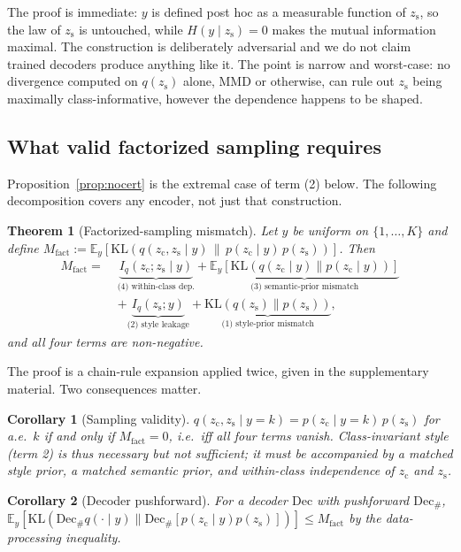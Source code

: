 \documentclass[letterpaper]{article}
\newtheorem{theorem}{Theorem}
\newtheorem{corollary}{Corollary}
\newcommand{\zc}{z_{\mathrm{c}}}
\newcommand{\zs}{z_{\mathrm{s}}}
\newcommand{\KL}{\mathrm{KL}}
\begin{document}
The proof is immediate: $y$ is defined post hoc as a measurable function of
$\zs$, so the law of $\zs$ is untouched, while $H(y\mid\zs)=0$ makes the
mutual information maximal. The construction is deliberately adversarial and
we do not claim trained decoders produce anything like it. The point is
narrow and worst-case: no divergence computed on $q(\zs)$ alone, MMD or
otherwise, can rule out $\zs$ being maximally class-informative, however the
dependence happens to be shaped.

\subsection{What valid factorized sampling requires}

Proposition~\ref{prop:nocert} is the extremal case of term (2) below. The
following decomposition covers any encoder, not just that construction.

\begin{theorem}[Factorized-sampling mismatch]
\label{thm:decomp}
Let $y$ be uniform on $\{1,\dots,K\}$ and define
$M_{\mathrm{fact}} := \mathbb E_y[\KL(q(\zc,\zs\mid y)\,\|\,p(\zc\mid
y)\,p(\zs))]$. Then
\begin{align*}
M_{\mathrm{fact}} =\;& \underbrace{I_q(\zc;\zs\mid y)}_{\text{(4) within-class dep.}}
 + \underbrace{\mathbb E_y[\KL(q(\zc\mid y)\|p(\zc\mid y))]}_{\text{(3) semantic-prior mismatch}}\\
 &+ \underbrace{I_q(\zs;y)}_{\text{(2) style leakage}}
 + \underbrace{\KL(q(\zs)\|p(\zs))}_{\text{(1) style-prior mismatch}},
\end{align*}
and all four terms are non-negative.
\end{theorem}

The proof is a chain-rule expansion applied twice, given in the
supplementary material. Two consequences matter.

\begin{corollary}[Sampling validity]
\label{cor:valid}
$q(\zc,\zs\mid y{=}k)=p(\zc\mid y{=}k)\,p(\zs)$ for a.e.\ $k$ if and only if
$M_{\mathrm{fact}}=0$, i.e.\ iff all four terms vanish. Class-invariant style
(term 2) is thus necessary but not sufficient; it must be accompanied by a
matched style prior, a matched semantic prior, and within-class independence
of $\zc$ and $\zs$.
\end{corollary}

\begin{corollary}[Decoder pushforward]
\label{cor:push}
For a decoder $\mathrm{Dec}$ with pushforward $\mathrm{Dec}_\#$,
$\mathbb E_y[\KL(\mathrm{Dec}_\# q(\cdot\mid y)\|\mathrm{Dec}_\#[p(\zc\mid
y)p(\zs)])] \le M_{\mathrm{fact}}$ by the data-processing inequality.
\end{corollary}
\end{document}
